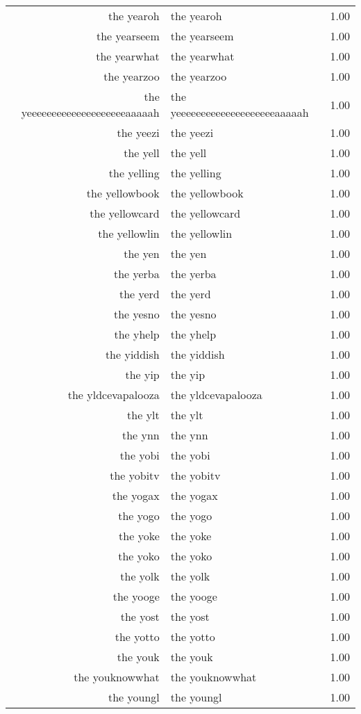 \begin{table}[ht]
\begin{tabular}{rlr}
  the yearoh & the yearoh & 1.00 \\ 
  the yearseem & the yearseem & 1.00 \\ 
  the yearwhat & the yearwhat & 1.00 \\ 
  the yearzoo & the yearzoo & 1.00 \\ 
  the yeeeeeeeeeeeeeeeeeeeeaaaaah & the yeeeeeeeeeeeeeeeeeeeeaaaaah & 1.00 \\ 
  the yeezi & the yeezi & 1.00 \\ 
  the yell & the yell & 1.00 \\ 
  the yelling & the yelling & 1.00 \\ 
  the yellowbook & the yellowbook & 1.00 \\ 
  the yellowcard & the yellowcard & 1.00 \\ 
  the yellowlin & the yellowlin & 1.00 \\ 
  the yen & the yen & 1.00 \\ 
  the yerba & the yerba & 1.00 \\ 
  the yerd & the yerd & 1.00 \\ 
  the yesno & the yesno & 1.00 \\ 
  the yhelp & the yhelp & 1.00 \\ 
  the yiddish & the yiddish & 1.00 \\ 
  the yip & the yip & 1.00 \\ 
  the yldcevapalooza & the yldcevapalooza & 1.00 \\ 
  the ylt & the ylt & 1.00 \\ 
  the ynn & the ynn & 1.00 \\ 
  the yobi & the yobi & 1.00 \\ 
  the yobitv & the yobitv & 1.00 \\ 
  the yogax & the yogax & 1.00 \\ 
  the yogo & the yogo & 1.00 \\ 
  the yoke & the yoke & 1.00 \\ 
  the yoko & the yoko & 1.00 \\ 
  the yolk & the yolk & 1.00 \\ 
  the yooge & the yooge & 1.00 \\ 
  the yost & the yost & 1.00 \\ 
  the yotto & the yotto & 1.00 \\ 
  the youk & the youk & 1.00 \\ 
  the youknowwhat & the youknowwhat & 1.00 \\ 
  the youngl & the youngl & 1.00 \\ 

\end{tabular}
\end{table}
